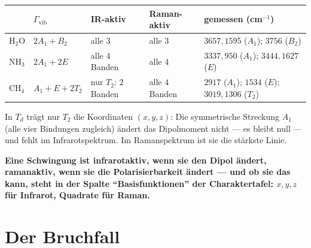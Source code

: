 \begin{merksatz}
\begin{center}
{\small
\renewcommand{\arraystretch}{1.46}
\begin{tabular}{@{}P{1.6cm}P{2.6cm}P{2.3cm}P{2.3cm}P{3.6cm}@{}}
\toprule
 & $\Gamma_{\mathrm{vib}}$ & IR-aktiv & Raman-aktiv & gemessen (cm$^{-1}$)\\
\midrule
$\mathrm{H_2O}$ & $2A_1 + B_2$ & alle $3$ & alle $3$ & $3657, 1595$ ($A_1$); $3756$ ($B_2$)\\
$\mathrm{NH_3}$ & $2A_1 + 2E$ & alle $4$ Banden & alle $4$ & $3337, 950$ ($A_1$); $3444, 1627$ ($E$)\\
$\mathrm{CH_4}$ & $A_1 + E + 2T_2$ & nur $T_2$: $2$ Banden & alle $4$ Banden & $2917$ ($A_1$); $1534$ ($E$); $3019, 1306$ ($T_2$)\\
\bottomrule
\end{tabular}}
\end{center}
In $T_d$ trägt nur $T_2$ die Koordinaten $(x, y, z)$: Die symmetrische Streckung $A_1$ (alle vier Bindungen zugleich) ändert das Dipolmoment nicht --- es bleibt null --- und fehlt im Infrarotspektrum. Im Ramanspektrum ist sie die stärkste Linie.

\begin{center}
\begin{minipage}{0.9\textwidth}
\textbf{Eine Schwingung ist infrarotaktiv, wenn sie den Dipol ändert, ramanaktiv, wenn sie die Polarisierbarkeit ändert --- und ob sie das kann, steht in der Spalte \enquote{Basisfunktionen} der Charaktertafel: $x, y, z$ für Infrarot, Quadrate für Raman.}
\end{minipage}
\end{center}
\end{merksatz}

\section{Der Bruchfall}

